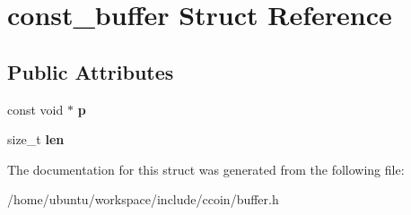 \hypertarget{structconst__buffer}{\section{const\-\_\-buffer Struct Reference}
\label{structconst__buffer}
}
\subsection*{Public Attributes}
\begin{DoxyCompactItemize}
\item 
\hypertarget{structconst__buffer_a0f8f88d516b9e6a9088aa7927b780f01}{const void $\ast$ {\bfseries p}}\label{structconst__buffer_a0f8f88d516b9e6a9088aa7927b780f01}

\item 
\hypertarget{structconst__buffer_aeea2fa428f380d27375680cc0d7d9952}{size\-\_\-t {\bfseries len}}\label{structconst__buffer_aeea2fa428f380d27375680cc0d7d9952}

\end{DoxyCompactItemize}


The documentation for this struct was generated from the following file\-:\begin{DoxyCompactItemize}
\item 
/home/ubuntu/workspace/include/ccoin/buffer.\-h\end{DoxyCompactItemize}

